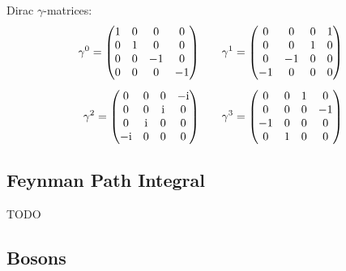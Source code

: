 			\noindent
			Dirac $\gamma$-matrices:
			\begin{equation}
				\begin{aligned}
					\gamma^0 = \left( \begin{matrix}
						 1 &  0 &  0 &  0 \\
						 0 &  1 &  0 &  0 \\
						 0 &  0 & -1 &  0 \\
						 0 &  0 &  0 & -1 \\
					\end{matrix} \right)
					&\hspace{20pt}
					\gamma^1 = \left( \begin{matrix}
						 0 &  0 &  0 &  1 \\
						 0 &  0 &  1 &  0 \\
						 0 & -1 &  0 &  0 \\
						-1 &  0 &  0 &  0 \\
					\end{matrix} \right) \\[5pt]
					\gamma^2 = \left( \begin{matrix}
						  0 &   0 &   0 & -\mathrm{i} \\
						  0 &   0 &  \mathrm{i} &   0 \\
						  0 &  \mathrm{i} &   0 &   0 \\
						-\mathrm{i} &   0 &   0 &   0 \\
					\end{matrix} \right)
					&\hspace{20pt}
					\gamma^3 = \left( \begin{matrix}
						 0 &  0 &  1 &  0 \\
						 0 &  0 &  0 & -1 \\
						-1 &  0 &  0 &  0 \\
						 0 &  1 &  0 &  0 \\
					\end{matrix} \right) \\
				\end{aligned}
			\end{equation}


	\subsection{Feynman Path Integral}
		TODO

	\subsection{Bosons}
